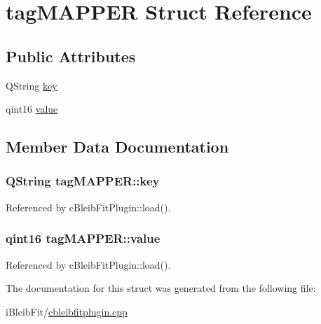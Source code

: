 \hypertarget{structtag_m_a_p_p_e_r}{}\section{tag\+M\+A\+P\+P\+ER Struct Reference}
\label{structtag_m_a_p_p_e_r}
\subsection*{Public Attributes}
\begin{DoxyCompactItemize}
\item 
Q\+String \hyperlink{structtag_m_a_p_p_e_r_a34b0aca2d4ce5c5d2196c087938f31ec}{key}
\item 
qint16 \hyperlink{structtag_m_a_p_p_e_r_a5cd9d767951123badf7d7dcfcdb86bbb}{value}
\end{DoxyCompactItemize}


\subsection{Member Data Documentation}
\subsubsection[{\texorpdfstring{key}{key}}]{\setlength{\rightskip}{0pt plus 5cm}Q\+String tag\+M\+A\+P\+P\+E\+R\+::key}\hypertarget{structtag_m_a_p_p_e_r_a34b0aca2d4ce5c5d2196c087938f31ec}{}\label{structtag_m_a_p_p_e_r_a34b0aca2d4ce5c5d2196c087938f31ec}


Referenced by c\+Bleib\+Fit\+Plugin\+::load().

\subsubsection[{\texorpdfstring{value}{value}}]{\setlength{\rightskip}{0pt plus 5cm}qint16 tag\+M\+A\+P\+P\+E\+R\+::value}\hypertarget{structtag_m_a_p_p_e_r_a5cd9d767951123badf7d7dcfcdb86bbb}{}\label{structtag_m_a_p_p_e_r_a5cd9d767951123badf7d7dcfcdb86bbb}


Referenced by c\+Bleib\+Fit\+Plugin\+::load().



The documentation for this struct was generated from the following file\+:\begin{DoxyCompactItemize}
\item 
i\+Bleib\+Fit/\hyperlink{cbleibfitplugin_8cpp}{cbleibfitplugin.\+cpp}\end{DoxyCompactItemize}
